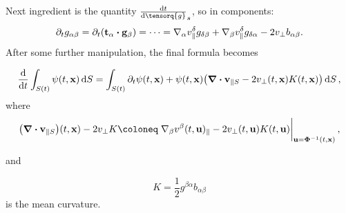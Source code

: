 \documentclass[../main.tex]{subfiles}
\begin{document}
Next ingredient is the quantity $\dv{t} \tensorq{g}_s$, so in components:
\[
	\partial_t g_{\alpha \beta} = \partial_t\qty(\vb{t}_{\alpha} \vdot \vb{g}_{\beta}) = \dots =\nabla_{\alpha} v_{\parallel}^\delta g_{\delta \beta}+ \nabla_{\beta}v^{\delta}_{\parallel} g_{\delta \alpha}-2v_{\perp}b_{\alpha \beta}.
\]
After some further manipulation, the final formula becomes

\begin{equation}
	\dv{t} \int_{S(t)}\psi(t,\vb{x})\dd{S} = \int_{S(t)}\partial_t \psi\qty(t,\vb{x})+\psi(t,\vb{x})\qty(\divergence{\vb{v}_{\parallel S}} - 2 v_{\perp}\qty(t,\vb{x})K\qty(t,\vb{x}))\dd{S},
\end{equation}
where
\[
	\qty(\divergence{\vb{v}_{\parallel S}})\qty(t,\vb{x}) - 2 v_{\perp}K \coloneq \eval{\nabla_{\beta}v^{\beta}(t,\vb{u})_{\parallel}-2v_{\perp}(t,\vb{u})K(t,\vb{u})}_{\vb{u}=\inverse{\vb*{\Phi}}\qty(t,\vb{x})},
\]

and

\[
	K = \frac{1}{2}g^{\beta \alpha} b_{\alpha \beta}
\]
is the mean curvature.
\end{document}
